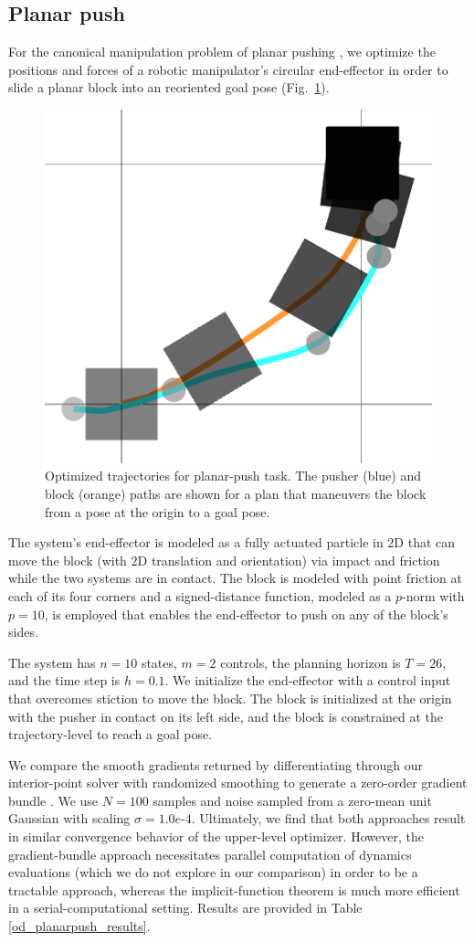 \subsection{Planar push}
For the canonical manipulation problem of planar pushing \cite{hogan2016feedback}, we optimize the positions and forces of a robotic manipulator's circular end-effector in order to slide a planar block into an reoriented goal pose (Fig.~\ref{od_planar_push}).

\begin{figure}[H]
	\centering
	\includegraphics[width=.3\textwidth]{optimization_dynamics/planar_push_rotate_crop_2.png}
	\caption[Plan for planar-push task]{Optimized trajectories for planar-push task. The pusher (blue) and block (orange) paths are shown for a plan that maneuvers the block from a pose at the origin to a goal pose.}
	\label{od_planar_push}
\end{figure}

The system's end-effector is modeled as a fully actuated particle in 2D that can move the block (with 2D translation and orientation) via impact and friction while the two systems are in contact. The block is modeled with point friction at each of its four corners and a signed-distance function, modeled as a $p$-norm with $p=10$, is employed that enables the end-effector to push on any of the block's sides.

The system has $n = 10$ states, $m = 2$ controls, the planning horizon is $T = 26$, and the time step is $h = 0.1$. We initialize the end-effector with a control input that overcomes stiction to move the block. The block is initialized at the origin with the pusher in contact on its left side, and the block is constrained at the trajectory-level to reach a goal pose.

We compare the smooth gradients returned by differentiating through our interior-point solver with randomized smoothing to generate a zero-order gradient bundle \cite{suh2022bundled}. We use $N=100$ samples and noise sampled from a zero-mean unit Gaussian with scaling $\sigma=1.0e\mbox{-}4$. Ultimately, we find that both approaches result in similar convergence behavior of the upper-level optimizer. However, the gradient-bundle approach necessitates parallel computation of dynamics evaluations (which we do not explore in our comparison) in order to be a tractable approach, whereas the implicit-function theorem is much more efficient in a serial-computational setting. Results are provided in Table \ref{od_planarpush_results}.

